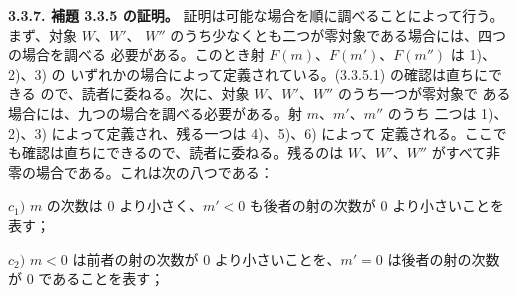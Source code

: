 \medskip\noindent\textbf{3.3.7. 補題 3.3.5 の証明。}\quad
証明は可能な場合を順に調べることによって行う。まず、対象 $W$、$W'$、
$W''$ のうち少なくとも二つが零対象である場合には、四つの場合を調べる
必要がある。このとき射 $F(m)$、$F(m')$、$F(m'')$ は 1)、2)、3) の
いずれかの場合によって定義されている。(3.3.5.1) の確認は直ちにできる
ので、読者に委ねる。次に、対象 $W$、$W'$、$W''$ のうち一つが零対象で
ある場合には、九つの場合を調べる必要がある。射 $m$、$m'$、$m''$ のうち
二つは 1)、2)、3) によって定義され、残る一つは 4)、5)、6) によって
定義される。ここでも確認は直ちにできるので、読者に委ねる。残るのは
$W$、$W'$、$W''$ がすべて非零の場合である。これは次の八つである：

\noindent$c_1)$ $m$ の次数は 0 より小さく、$m'<0$ も後者の射の次数が 0 より小さいことを表す；

\noindent$c_2)$ $m<0$ は前者の射の次数が 0 より小さいことを、$m'=0$ は後者の射の次数が 0 であることを表す；
\endgroup
